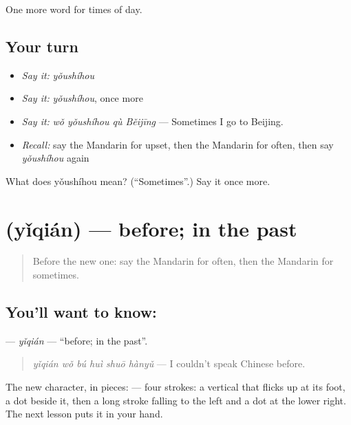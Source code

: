 \begin{grammarlens}[title={What you've built}]
One more word for times of day.
\end{grammarlens}

\subsection*{Your turn}
\begin{itemize}
\raggedright
  \item \emph{Say it:} \emph{yǒushíhou}
  \item \emph{Say it:} \emph{yǒushíhou}, once more
  \item \emph{Say it:} \emph{wǒ yǒushíhou qù Běijīng} — Sometimes I go to Beijing.
  \item \emph{Recall:} say the Mandarin for upset, then the Mandarin for often, then say \emph{yǒushíhou} again
\end{itemize}

\begin{tcolorbox}[breakable,colback=teal!4,colframe=teal!35!black,title={Before you move on}]
What does yǒushíhou mean? (\textquotedblleft{}Sometimes\textquotedblright{}.) Say it once more.
\end{tcolorbox}
\section[\texorpdfstring{\zh{以前} (yǐqián)}{以前 (yǐqián)}]{ (yǐqián) — before; in the past}

\label{lesson:ZH-C126-yiqian}



\begin{quote}
Before the new one: say the Mandarin for often, then the Mandarin for sometimes.
\end{quote}

\subsection*{You'll want to know: }
\textbf{} — \emph{yǐqián} — \textquotedblleft{}before; in the past\textquotedblright{}.

\begin{quote}
\textbf{} \emph{yǐqián wǒ bú huì shuō hànyǔ} — I couldn't speak Chinese before.
\end{quote}

The new character, in pieces:  — four strokes: a vertical that flicks up at its foot, a dot beside it, then a long stroke falling to the left and a dot at the lower right. The next lesson puts it in your hand.

